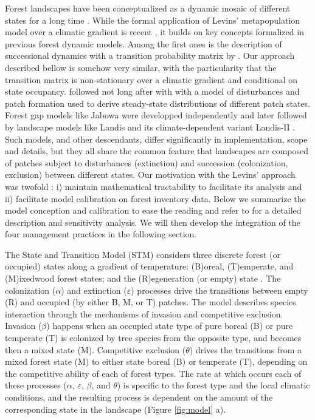 Forest landscapes have been conceptualized as a dynamic mosaic of
different states for a long time \citep{PICKETT1985}. While the formal
application of Levins' metapopulation model over a climatic gradient is
recent \citep{Talluto2017}, it builds on key concepts formalized in
previous forest dynamic models. Among the first ones is the description
of successional dynamics with a transition probability matrix by
\citet{horn1971adaptive}. Our approach described bellow is somehow very
similar, with the particularity that the transition matrix is
non-stationary over a climatic gradient and conditional on state
occupancy. \citet{Levin1974} followed not long after with with a model
of disturbances and patch formation used to derive steady-state
distributions of different patch states. Forest gap models like Jabowa
were developped independently \citep{Botkin1972} and later followed by
landscape models like Landis \citep{Mladenoff1996} and its
climate-dependent variant Landis-II \citep{Scheller2004}. Such models,
and other descendants, differ significantly in implementation, scope and
details, but they all share the common feature that landscapes are
composed of patches subject to disturbances (extinction) and succession
(colonization, exclusion) between different states. Our motivation with
the Levins' approach was twofold : i) maintain mathematical tractability
to facilitate its analysis and ii) facilitate model calibration on
forest inventory data. Below we summarize the model conception and
calibration to ease the reading and refer to \citet{Vissault2020} for a
detailed description and sensitivity analysis. We will then develop the
integration of the four management practices in the following section.

The State and Transition Model (STM) considers three discrete forest (or
occupied) states along a gradient of temperature: (B)oreal, (T)emperate,
and (M)ixedwood forest states; and the (R)egeneration (or empty) state
\citep{Vissault2020}. The colonization (\(\alpha\)) and extinction
(\(\varepsilon\)) processes drive the transitions between empty (R) and
occupied (by either B, M, or T) patches. The model describes species
interaction through the mechanisms of invasion and competitive
exclusion. Invasion (\(\beta\)) happens when an occupied state type of
pure boreal (B) or pure temperate (T) is colonized by tree species from
the opposite type, and becomes then a mixed state (M). Competitive
exclusion (\(\theta\)) drives the transitions from a mixed forest state
(M) to either state boreal (B) or temperate (T), depending on the
competitive ability of each of forest types. The rate at which occurs
each of these processes (\(\alpha\), \(\varepsilon\), \(\beta\), and
\(\theta\)) is specific to the forest type and the local climatic
conditions, and the resulting process is dependent on the amount of the
corresponding state in the landscape (Figure \ref{fig:model} a).


